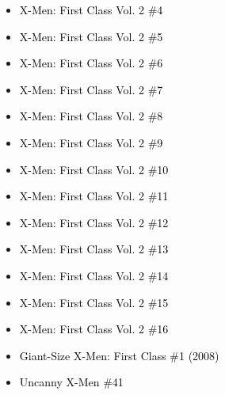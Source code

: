 \documentclass[12pt]{article}
\newcommand{\checkbox}{\raisebox{0.0ex}{\fbox{\rule{0ex}{1.5ex} \rule{1.5ex}{0ex}}}}
\begin{document}
\vspace{0.3cm}
\noindent
\begin{tcolorbox}[
  colback=white!95!gray,
  colframe=black,
  width=\textwidth,
  arc=4mm,
  auto outer arc,
  boxrule=0.8pt,
  left=8pt,right=8pt,top=8pt,bottom=8pt
]
\begin{itemize}[left=0pt,label={\checkbox}]
  \item \textcolor{black}{X-Men: First Class Vol. 2 \#4}
  \item \textcolor{black}{X-Men: First Class Vol. 2 \#5}
  \item \textcolor{black}{X-Men: First Class Vol. 2 \#6}
  \item \textcolor{black}{X-Men: First Class Vol. 2 \#7}
  \item \textcolor{black}{X-Men: First Class Vol. 2 \#8}
  \item \textcolor{black}{X-Men: First Class Vol. 2 \#9}
  \item \textcolor{black}{X-Men: First Class Vol. 2 \#10}
  \item \textcolor{black}{X-Men: First Class Vol. 2 \#11}
  \item \textcolor{black}{X-Men: First Class Vol. 2 \#12}
  \item \textcolor{black}{X-Men: First Class Vol. 2 \#13}
  \item \textcolor{black}{X-Men: First Class Vol. 2 \#14}
  \item \textcolor{black}{X-Men: First Class Vol. 2 \#15}
  \item \textcolor{black}{X-Men: First Class Vol. 2 \#16}
  \item \textcolor{black}{Giant-Size X-Men: First Class \#1 (2008)}
  \item \textcolor{black}{Uncanny X-Men \#41}
\end{itemize}
\end{tcolorbox}


\newpage
{}
\end{document}
